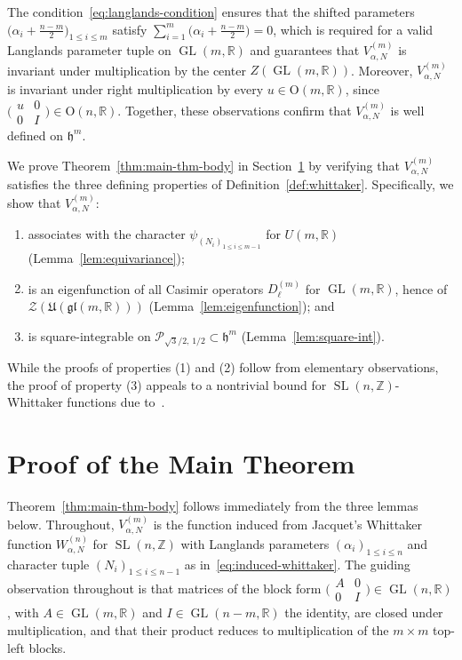 \documentclass[12pt, reqno, oneside]{amsart}
\theoremstyle{definition}
\numberwithin{equation}{section}
\newcommand{\Z}{\mathbb{Z}}
\newcommand{\R}{\mathbb{R}}
\newcommand{\hh}{\mathfrak{h}}
\newcommand{\gl}{\mathfrak{gl}}
\DeclareMathOperator{\GL}{GL}
\DeclareMathOperator{\SL}{SL}
\begin{document}
The condition~\eqref{eq:langlands-condition} ensures that the shifted
parameters $\bigl(\alpha_i+\frac{n-m}{2}\bigr)_{1\leq i\leq m}$ satisfy
$\sum_{i=1}^m\bigl(\alpha_i+\frac{n-m}{2}\bigr)=0$, which is required for
a valid Langlands parameter tuple on $\GL(m,\R)$ and guarantees that
$V_{\alpha,N}^{(m)}$ is invariant under multiplication by the center
$Z(\GL(m,\R))$. Moreover, $V_{\alpha,N}^{(m)}$ is invariant under right
multiplication by every $u\in\mathrm{O}(m,\R)$, since $\bigl(\begin{smallmatrix}u&0\\0&I\end{smallmatrix}\bigr)\in\mathrm{O}(n,\R)$. Together,
these observations confirm that $V_{\alpha,N}^{(m)}$ is well defined on
$\hh^m$.

We prove Theorem~\ref{thm:main-thm-body} in Section~\ref{sec:proof} by
verifying that $V_{\alpha,N}^{(m)}$ satisfies the three defining properties
of Definition~\ref{def:whittaker}. Specifically, we show that
$V_{\alpha,N}^{(m)}$:
\begin{enumerate}[label=(\arabic*)]
  \item associates with the character $\psi_{(N_i)_{1\leq i\leq m-1}}$
    for $U(m,\R)$ (Lemma~\ref{lem:equivariance});
  \item is an eigenfunction of all Casimir operators $D_\ell^{(m)}$ for
    $\GL(m,\R)$, hence of $\mathcal{Z}(\mathfrak{U}(\gl(m,\R)))$
    (Lemma~\ref{lem:eigenfunction}); and
  \item is square-integrable on $\mathcal{P}_{\!\sqrt{3}/2,\,1/2}\subset\hh^m$
    (Lemma~\ref{lem:square-int}).
\end{enumerate}
While the proofs of properties (1) and (2) follow from elementary
observations, the proof of property (3) appeals to a nontrivial bound for
$\SL(n,\Z)$-Whittaker functions due to~\cite{GMW21}.

\section{Proof of the Main Theorem}
\label{sec:proof}

Theorem~\ref{thm:main-thm-body} follows immediately from the three lemmas
below. Throughout, $V_{\alpha,N}^{(m)}$ is the function induced from
Jacquet's Whittaker function $W_{\alpha,N}^{(n)}$ for $\SL(n,\Z)$ with
Langlands parameters $(\alpha_i)_{1\leq i\leq n}$ and character tuple
$(N_i)_{1\leq i\leq n-1}$ as in~\eqref{eq:induced-whittaker}. The guiding
observation throughout is that matrices of the block form
$\bigl(\begin{smallmatrix}A&0\\0&I\end{smallmatrix}\bigr)\in \GL(n,\R)$,
with $A\in \GL(m,\R)$ and $I\in \GL(n-m,\R)$ the identity, are closed under
multiplication, and that their product reduces to multiplication of the
$m\times m$ top-left blocks.
\end{document}
